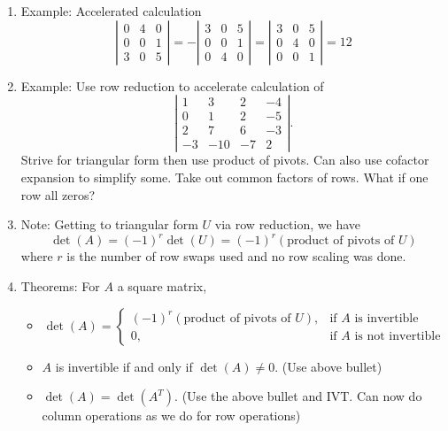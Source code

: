 \documentclass{article}
\begin{document}
\begin{enumerate}
\item Example: Accelerated calculation
\[
\left|
\begin{array}{ccc}
0 & 4 & 0 \\
0 & 0 & 1 \\
3 & 0 & 5
\end{array}
\right|= -\left|
\begin{array}{ccc}
3 & 0 & 5 \\
0 & 0 & 1 \\
0 & 4 & 0 
\end{array}
\right|= \left|
\begin{array}{ccc}
3 & 0 & 5 \\
0 & 4 & 0 \\
0 & 0 & 1 
\end{array}
\right|=12
\]

\item Example: Use row reduction to accelerate calculation of 
\[
\left|
\begin{array}{cccc}
1 & 3 & 2 & -4 \\
0 & 1 & 2 & -5 \\
2 & 7 & 6 & -3 \\
-3 & -10 & -7 & 2
\end{array}
\right|.
\]
Strive for triangular form then use product of pivots. Can also use cofactor expansion to simplify some. Take out common factors of rows. What if one row all zeros? 

\item Note: Getting to triangular form $U$ via row reduction, we have
\[
\det(A) = (-1)^r \det(U) = (-1)^r (\text{product of pivots of $U$})
\]
where $r$ is the number of row swaps used and no row scaling was done.

\item Theorems: For $A$ a square matrix,
\begin{itemize}
\item  
\[
\det(A) = 
\begin{cases}
(-1)^r (\text{product of pivots of $U$}), & \text{if $A$ is invertible} \\
0, & \text{if $A$ is not invertible}
\end{cases}
\]
\item $A$ is invertible if and only if $\det(A) \neq 0$. (Use above bullet)
\item $\det(A) = \det(A^T)$. (Use the above bullet and IVT. Can now do column operations as we do for row operations)
\end{itemize}


\end{enumerate}
\end{document}
